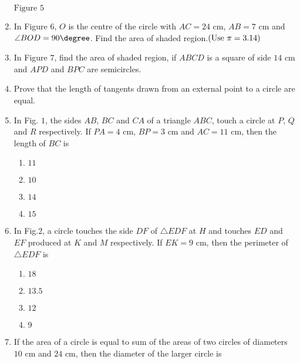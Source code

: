 \begin{enumerate}
\begin{figure}[ht]
\begin{tikzpicture}
\end{tikzpicture}
\end{figure}
\begin{center}
$\text{Figure } 5$
\end{center}
\item In Figure $6$, $O$ is the centre of the circle with $AC = 24 \text{ cm}$, $AB = 7 \text{ cm}$ and $\angle BOD = 90\degree$. Find the area of shaded region.$\brak{\text{Use } \pi = 3.14}$\\
\item In Figure $7$, find the area of shaded region, if $ABCD$ is a square of side $14 \text{ cm}$ and $APD$ and $BPC$ are semicircles.\\
\item Prove that the length of tangents drawn from an external point to a circle are equal.\\
\item In Fig. $1$, the sides $AB$, $BC$ and $CA$ of a triangle $ABC$, touch a circle at $P$, $Q$ and $R$ respectively. If $PA = 4\text{ cm}$, $BP = 3\text{ cm}$ and $AC = 11\text{ cm}$, then the length of $BC$  is\\
\begin{enumerate}
\item $11$\\
\item $10$\\
\item $14$\\
\item $15$\\
\end{enumerate}
\item In Fig.$2$, a circle touches the side $DF$ of $\triangle EDF$ at $H$ and touches $ED$ and $EF$ produced at $K$ and $M$ respectively. If $EK = 9\text{ cm}$, then the perimeter of $\triangle EDF$  is\\
\begin{enumerate}
\item $18$\\
\item $13.5$\\
\item $12$\\
\item $9$\\
\end{enumerate}
\item If the area of a circle is equal to sum of the areas of two circles of diameters $10 \text{ cm}$ and $24 \text{ cm}$, then the diameter of the larger circle  is\\

\end{enumerate}
